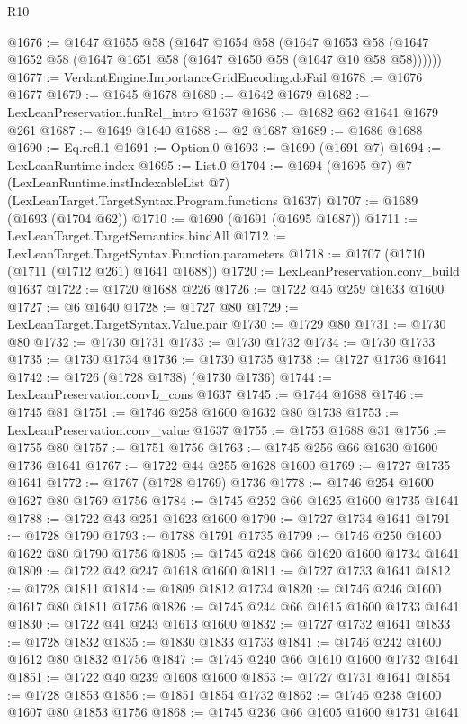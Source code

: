 \begin{lexlean}{R10}
\begin{coremodule}
@1676 := @1647
    @1655
    @58
    (@1647
      @1654
      @58
      (@1647 @1653 @58 (@1647 @1652 @58 (@1647 @1651 @58 (@1647 @1650 @58 (@1647 @10 @58 @58))))))
@1677 := VerdantEngine.ImportanceGridEncoding.doFail
@1678 := @1676 @1677
@1679 := @1645 @1678
@1680 := @1642 @1679
@1682 := LexLeanPreservation.funRel_intro @1637
@1686 := @1682 @62 @1641 @1679 @261
@1687 := @1649 @1640
@1688 := @2 @1687
@1689 := @1686 @1688
@1690 := Eq.refl.{1}
@1691 := Option.{0}
@1693 := @1690 (@1691 @7)
@1694 := LexLeanRuntime.index
@1695 := List.{0}
@1704 := @1694
    (@1695 @7)
    @7
    (LexLeanRuntime.instIndexableList @7)
    (LexLeanTarget.TargetSyntax.Program.functions @1637)
@1707 := @1689 (@1693 (@1704 @62))
@1710 := @1690 (@1691 (@1695 @1687))
@1711 := LexLeanTarget.TargetSemantics.bindAll
@1712 := LexLeanTarget.TargetSyntax.Function.parameters
@1718 := @1707 (@1710 (@1711 (@1712 @261) @1641 @1688))
@1720 := LexLeanPreservation.conv_build @1637
@1722 := @1720 @1688 @226
@1726 := @1722 @45 @259 @1633 @1600
@1727 := @6 @1640
@1728 := @1727 @80
@1729 := LexLeanTarget.TargetSyntax.Value.pair
@1730 := @1729 @80
@1731 := @1730 @80
@1732 := @1730 @1731
@1733 := @1730 @1732
@1734 := @1730 @1733
@1735 := @1730 @1734
@1736 := @1730 @1735
@1738 := @1727 @1736 @1641
@1742 := @1726 (@1728 @1738) (@1730 @1736)
@1744 := LexLeanPreservation.convL_cons @1637
@1745 := @1744 @1688
@1746 := @1745 @81
@1751 := @1746 @258 @1600 @1632 @80 @1738
@1753 := LexLeanPreservation.conv_value @1637
@1755 := @1753 @1688 @31
@1756 := @1755 @80
@1757 := @1751 @1756
@1763 := @1745 @256 @66 @1630 @1600 @1736 @1641
@1767 := @1722 @44 @255 @1628 @1600
@1769 := @1727 @1735 @1641
@1772 := @1767 (@1728 @1769) @1736
@1778 := @1746 @254 @1600 @1627 @80 @1769 @1756
@1784 := @1745 @252 @66 @1625 @1600 @1735 @1641
@1788 := @1722 @43 @251 @1623 @1600
@1790 := @1727 @1734 @1641
@1791 := @1728 @1790
@1793 := @1788 @1791 @1735
@1799 := @1746 @250 @1600 @1622 @80 @1790 @1756
@1805 := @1745 @248 @66 @1620 @1600 @1734 @1641
@1809 := @1722 @42 @247 @1618 @1600
@1811 := @1727 @1733 @1641
@1812 := @1728 @1811
@1814 := @1809 @1812 @1734
@1820 := @1746 @246 @1600 @1617 @80 @1811 @1756
@1826 := @1745 @244 @66 @1615 @1600 @1733 @1641
@1830 := @1722 @41 @243 @1613 @1600
@1832 := @1727 @1732 @1641
@1833 := @1728 @1832
@1835 := @1830 @1833 @1733
@1841 := @1746 @242 @1600 @1612 @80 @1832 @1756
@1847 := @1745 @240 @66 @1610 @1600 @1732 @1641
@1851 := @1722 @40 @239 @1608 @1600
@1853 := @1727 @1731 @1641
@1854 := @1728 @1853
@1856 := @1851 @1854 @1732
@1862 := @1746 @238 @1600 @1607 @80 @1853 @1756
@1868 := @1745 @236 @66 @1605 @1600 @1731 @1641

\end{coremodule}
\end{lexlean}
